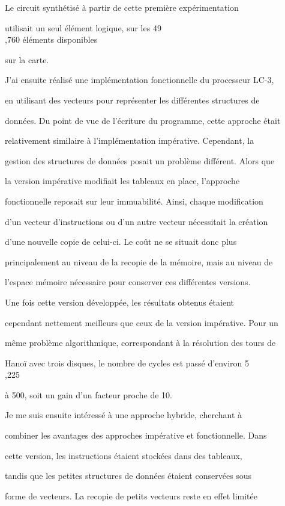 \documentclass{article}
\begin{document}
Le circuit synthétisé à partir de cette première expérimentation

utilisait un seul élément logique, sur les 49\\,760 éléments disponibles

sur la carte.

J'ai ensuite réalisé une implémentation fonctionnelle du processeur LC-3,

en utilisant des vecteurs pour représenter les différentes structures de

données. Du point de vue de l'écriture du programme, cette approche était

relativement similaire à l'implémentation impérative. Cependant, la

gestion des structures de données posait un problème différent. Alors que

la version impérative modifiait les tableaux en place, l'approche

fonctionnelle reposait sur leur immuabilité. Ainsi, chaque modification

d'un vecteur d'instructions ou d'un autre vecteur nécessitait la création

d'une nouvelle copie de celui-ci. Le coût ne se situait donc plus

principalement au niveau de la recopie de la mémoire, mais au niveau de

l'espace mémoire nécessaire pour conserver ces différentes versions.

Une fois cette version développée, les résultats obtenus étaient

cependant nettement meilleurs que ceux de la version impérative. Pour un

même problème algorithmique, correspondant à la résolution des tours de

Hanoï avec trois disques, le nombre de cycles est passé d'environ 5\\,225

à 500, soit un gain d'un facteur proche de 10.

Je me suis ensuite intéressé à une approche hybride, cherchant à

combiner les avantages des approches impérative et fonctionnelle. Dans

cette version, les instructions étaient stockées dans des tableaux,

tandis que les petites structures de données étaient conservées sous

forme de vecteurs. La recopie de petits vecteurs reste en effet limitée
\end{document}
